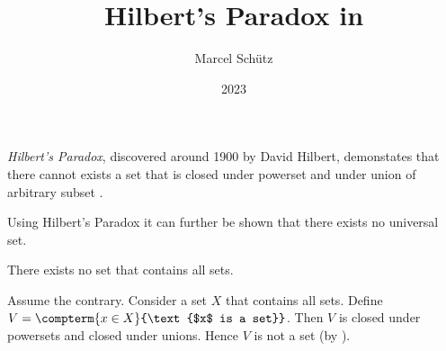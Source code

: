 \documentclass{stex}
\title{Hilbert's Paradox in \Naproche}
\author{Marcel Schütz}
\date{2023}
\begin{document}
\maketitle

\noindent \emph{Hilbert's Paradox}, discovered around 1900 by David Hilbert, demonstates that there cannot exists a set that is closed under powerset and under union of arbitrary subset \cite{PeckhausKahl2002}.


\noindent Using Hilbert's Paradox it can further be shown that there exists no universal set.

\begin{fcorollary*}
  There exists no set that contains all sets.
\end{fcorollary*}
\begin{fproof}[method=contradiction]
  Assume the contrary.
  Consider a set $X$ that contains all sets.
  Define $V = \compterm{x \in X}{\text{$x$ is a set}}$.
  Then $V$ is closed under powersets and closed under unions.
  Hence $V$ is not a set (by ).
\end{fproof}

\printbibliography
\end{document}
